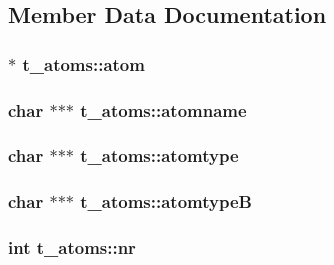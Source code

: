 \subsection{\-Member \-Data \-Documentation}
\hypertarget{structt__atoms_ac3708914e96b52388974827b0cb3b95e}{
\subsubsection[{atom}]{ $\ast$ {\bf t\-\_\-atoms\-::atom}}}\label{structt__atoms_ac3708914e96b52388974827b0cb3b95e}
\hypertarget{structt__atoms_a1c7d1e30ef9db30f8ee6c99c72d35b07}{
\subsubsection[{atomname}]{\setlength{\rightskip}{0pt plus 5cm}char $\ast$$\ast$$\ast$ {\bf t\-\_\-atoms\-::atomname}}}\label{structt__atoms_a1c7d1e30ef9db30f8ee6c99c72d35b07}
\hypertarget{structt__atoms_a6bfa61df89fa0a2c40fc861a2c0cccea}{
\subsubsection[{atomtype}]{\setlength{\rightskip}{0pt plus 5cm}char $\ast$$\ast$$\ast$ {\bf t\-\_\-atoms\-::atomtype}}}\label{structt__atoms_a6bfa61df89fa0a2c40fc861a2c0cccea}
\hypertarget{structt__atoms_af5db37924f454f3a5b3f5ddc487d2a1b}{
\subsubsection[{atomtype\-B}]{\setlength{\rightskip}{0pt plus 5cm}char $\ast$$\ast$$\ast$ {\bf t\-\_\-atoms\-::atomtype\-B}}}\label{structt__atoms_af5db37924f454f3a5b3f5ddc487d2a1b}
\hypertarget{structt__atoms_a3a326d8bb4b00bd2fd5aecbd10ea3493}{
\subsubsection[{nr}]{\setlength{\rightskip}{0pt plus 5cm}int {\bf t\-\_\-atoms\-::nr}}}\label{structt__atoms_a3a326d8bb4b00bd2fd5aecbd10ea3493}
